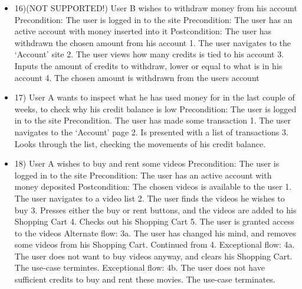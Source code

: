 \begin{itemize}
\item 16)(NOT SUPPORTED!)
User B wishes to withdraw money from his account
\newline Precondition: The user is logged in to the site
\newline Precondition: The user has an active account with money inserted into it
\newline Postcondition: The user has withdrawn the chosen amount from his account
    1. The user navigates to the ‘Account’ site
    2. The user views how many credits is tied to his account
    3. Inputs the amount of credits to withdraw, lower or equal to what is in his account
    4. The chosen amount is withdrawn from the users account

\item 17)
User A wants to inspect what he has used money for in the last couple of weeks, to check why his credit balance is low
\newline Precondition: The user is logged in to the site
\newline Precondition. The user has made some transaction
    1. The user navigates to the ‘Account’ page
    2. Is presented with a list of transactions
    3. Looks through the list, checking the movements of his credit balance.

\item 18)
User A wishes to buy and rent some videos
\newline Precondition: The user is logged in to the site
\newline Precondition: The user has an active account with money deposited
\newline Postcondition: The chosen videos is available to the user
    1. The user navigates to a video list
	2. The user finds the videos he wishes to buy
    3. Presses either the buy or rent buttons, and the videos are added to his Shopping Cart
    4. Checks out his Shopping Cart
    5. The user is granted access to the videos
\newline Alternate flow:
    3a. The user has changed his mind, and removes some videos from his Shopping Cart. Continued from 4.
\newline Exceptional flow:
    4a. The user does not want to buy videos anyway, and clears his Shopping Cart. The use-case termintes.
\newline Exceptional flow:
    4b. The user does not have sufficient credits to buy and rent these movies. The use-case terminates.


\end{itemize}
